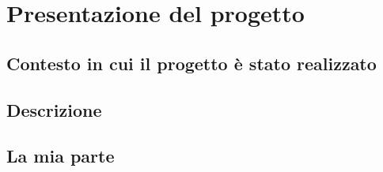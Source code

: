 
\chapter{Presentazione del progetto}
	\section{Contesto in cui il progetto è stato realizzato}
	\section{Descrizione}
	\section{La mia parte}